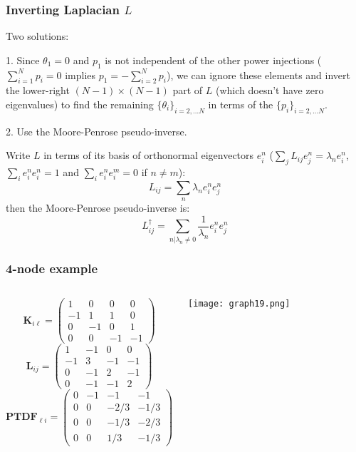 \documentclass[10pt,dvipsnames]{beamer}
\def\l{\lambda}
\begin{document}
\begin{frame}
  \frametitle{Inverting Laplacian $L$}

  Two solutions:

  1. Since $\theta_1 = 0$ and $p_1$ is not independent of the other
  power injections ($\sum_{i=1}^N p_i = 0$ implies $p_1 = -
  \sum_{i=2}^N p_i$), we can ignore these elements and invert
  the lower-right $(N-1) \times (N-1)$ part of $L$ (which doesn't have zero eigenvalues) to find the
  remaining $\{\theta_i\}_{i=2,\dots N}$ in terms of the
  $\{p_i\}_{i=2,\dots N}$.

  2. Use the Moore-Penrose pseudo-inverse.

  Write $L$ in terms of its basis of orthonormal eigenvectors $e^n_i$ ($\sum_j L_{ij} e^n_j = \l_n e^n_i$, $\sum_i e^n_i e^n_i = 1$ and  $\sum_i e^n_i e^m_i = 0$ if $n \neq m$):
  \begin{equation*}
    L_{ij} = \sum_n \l_n e^n_i e^n_j
  \end{equation*}
  then the Moore-Penrose pseudo-inverse is:
  \begin{equation*}
    L^\dagger_{ij} = \sum_{n | \l_n \neq 0} \frac{1}{\l_n} e^n_i e^n_j
  \end{equation*}



\end{frame}

\begin{frame}
  \frametitle{4-node example}

  \begin{columns}
\begin{equation*}
\mathbf{K}_{i \ell}=\left(\begin{matrix}
1 & 0 & 0 & 0\\
-1 & 1 & 1 & 0\\
0 & -1 & 0 & 1\\
0 & 0 & -1 & -1
\end{matrix}\right)
\end{equation*}
\begin{equation*}
\mathbf{L}_{ij}=\left(\begin{matrix}
1 & -1 & 0 & 0\\
-1 & 3 & -1 & -1\\
0 & -1 & 2 & -1\\
0 & -1 & -1 & 2
\end{matrix}\right)
\end{equation*}
\begin{equation*}
\mathbf{PTDF}_{\ell i}=\left(\begin{matrix}
0 & -1 & -1 & -1\\
0 & 0 & -2/3 & -1/3\\
0 & 0 & -1/3 & -2/3\\
0 & 0 & 1/3 & -1/3
\end{matrix}\right)
\end{equation*}

\texttt{[image: graph19.png]}
\end{columns}


\end{frame}
\end{document}
